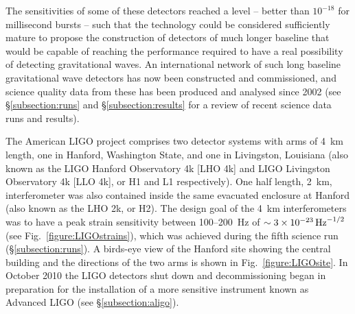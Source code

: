 \documentclass{article}
\begin{document}
The sensitivities of some of these detectors reached a level -- better than
$10^{-18}$ for millisecond bursts -- such that the technology could be
considered sufficiently mature to propose the construction of detectors of much
longer baseline that would be capable of reaching the performance required to
have a real possibility of detecting gravitational waves.  An international
network of such long baseline gravitational wave detectors has now been
constructed and commissioned, and science quality data from these has been
produced and analysed since 2002 (see \S\ref{subsection:runs} and
\S\ref{subsection:results} for a review of recent science data runs and results).

The American LIGO project \cite{LIGOweb} comprises two detector systems with
arms of 4~km length, one in Hanford, Washington State, and one in Livingston,
Louisiana (also known as the LIGO Hanford Observatory 4k [LHO 4k] and LIGO
Livingston Observatory 4k [LLO 4k], or H1 and L1 respectively). One half length,
2~km, interferometer was also contained inside the same evacuated enclosure at
Hanford (also known as the LHO 2k, or H2). The design goal of the 4~km
interferometers was to have a peak strain sensitivity between 100--200~Hz of
$\sim 3\times10^{-23}\,{\rm Hz}^{-1/2}$ \cite{LIGOSRD} (see
Fig.~\ref{figure:LIGOstrains}), which was achieved during the fifth science run
(\S\ref{subsection:runs}). A birds-eye view of the Hanford site showing the
central building and the directions of the two arms is shown in
Fig.~\ref{figure:LIGOsite}. In October 2010 the LIGO detectors shut down and
decommissioning began in preparation for the installation of a more sensitive 
instrument known as Advanced LIGO (see \S\ref{subsection:aligo}).

\end{document}
